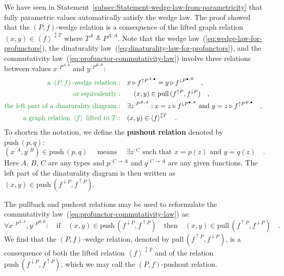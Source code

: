 We have seen in Statement~\ref{subsec:Statement-wedge-law-from-parametricity}
that fully parametric values automatically satisfy the wedge law.
The proof showed that the $\left(P,f\right)$-wedge relation is a
consequence of the lifted graph relation $(x,y)\in\left<f\right>^{\updownarrow T}$
where $T^{A}\triangleq P^{A,A}$. Note that the wedge law~(\ref{eq:wedge-law-for-profunctors}),
the dinaturality law~(\ref{eq:dinaturality-law-for-profunctors}),
and the commutativity law~(\ref{eq:profunctor-commutativity-law})
involve three relations between values $x^{:P^{A,A}}$ and $y^{:P^{B,B}}$:
\begin{align*}
{\color{greenunder}\text{a }\left(P,f\right)\text{-wedge relation}:}\quad & x\triangleright f^{\uparrow P^{A,\bullet}}=y\triangleright f^{\downarrow P^{\bullet,B}}\quad,\\
{\color{greenunder}\text{or equivalently}:}\quad & \quad(x,y)\in\text{pull}\,(f^{\uparrow P},f^{\downarrow P})\quad,\\
{\color{greenunder}\text{the left part of a dinaturality diagram}:}\quad & \exists z^{:P^{B,A}}:x=z\triangleright f^{\downarrow P^{\bullet,A}}\text{ and }y=z\triangleright f^{\uparrow P^{B,\bullet}}\quad,\\
{\color{greenunder}\text{a graph relation }\left<f\right>\text{ lifted to }T:}\quad & (x,y)\in\left<f\right>^{\updownarrow T}\quad.
\end{align*}
To shorten the notation, we define the \textbf{pushout} \textbf{relation}
denoted by $\text{push}\,(p,q)$:
\[
(x^{:A},y^{:B})\in\text{push}\,(p,q)\quad\text{ means }\quad\exists z^{:C}\text{ such that }x=p(z)\text{ and }y=q(z)\quad.
\]
Here $A$, $B$, $C$ are any types and $p^{:C\rightarrow A}$ and
$q^{:C\rightarrow A}$ are any given functions. The left part of the
dinaturality diagram is then written as $(x,y)\in\text{push}\,(f^{\downarrow P},f^{\uparrow P})$.

The pullback and pushout relations may be used to reformulate the
commutativity law~(\ref{eq:profunctor-commutativity-law}) as: 
\[
\forall x^{:P^{A,A}},y^{:P^{B,B}}:\quad\text{if}\quad(x,y)\in\text{push}\,(f^{\downarrow P},f^{\uparrow P})\quad\text{then}\quad(x,y)\in\text{pull}\,(f^{\uparrow P},f^{\downarrow P})\quad.
\]
We find that the $\left(P,f\right)$-wedge relation, denoted by $\text{pull}\,(f^{\uparrow P},f^{\downarrow P})$,
is a consequence of both the lifted relation $\left<f\right>^{\updownarrow T}$
and of the relation $\text{push}\,(f^{\downarrow P},f^{\uparrow P})$,
which we may call the $\left(P,f\right)$-pushout relation.

